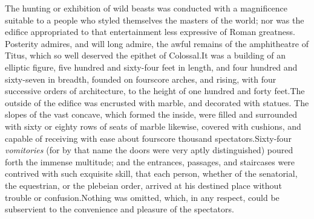 





The hunting or exhibition of wild beasts was conducted with a
magnificence suitable to a people who styled themselves the
masters of the world; nor was the edifice appropriated to that
entertainment less expressive of Roman greatness. Posterity
admires, and will long admire, the awful remains of the
amphitheatre of Titus, which so well deserved the epithet of
Colossal.\footnotemark[91] It was a building of an elliptic figure, five
hundred and sixty-four feet in length, and four hundred and
sixty-seven in breadth, founded on fourscore arches, and rising,
with four successive orders of architecture, to the height of one
hundred and forty feet.\footnotemark[92] The outside of the edifice was
encrusted with marble, and decorated with statues. The slopes of
the vast concave, which formed the inside, were filled and
surrounded with sixty or eighty rows of seats of marble likewise,
covered with cushions, and capable of receiving with ease about
fourscore thousand spectators.\footnotemark[93] Sixty-four \textit{vomitories} (for by
that name the doors were very aptly distinguished) poured forth
the immense multitude; and the entrances, passages, and
staircases were contrived with such exquisite skill, that each
person, whether of the senatorial, the equestrian, or the
plebeian order, arrived at his destined place without trouble or
confusion.\footnotemark[94] Nothing was omitted, which, in any respect, could
be subservient to the convenience and pleasure of the spectators.

